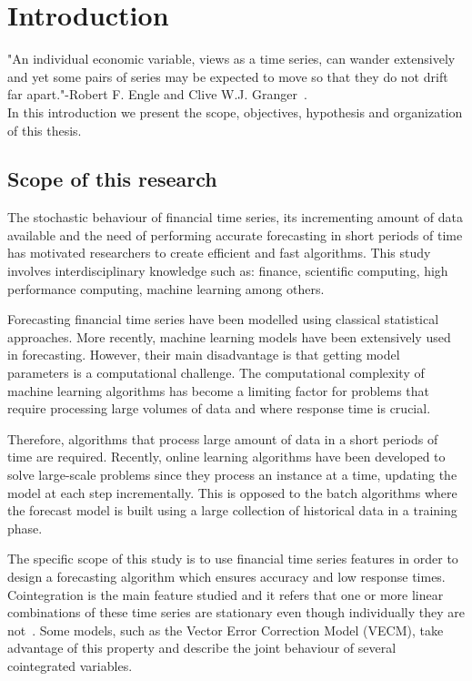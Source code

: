 \chapter{Introduction}\label{ch:introduction}

\vspace{0.5cm} 

"An individual economic variable, views as a time series, can wander extensively
and yet some pairs of series may be expected to move so that they do not drift
far apart."-Robert F. Engle and Clive W.J. Granger~\cite{engle1987}.\\
In this introduction we present the scope, objectives, hypothesis and
organization of this thesis.


\section{Scope of this research}

The stochastic behaviour of financial time series, its incrementing
amount of data available and the need of performing accurate forecasting in
short periods of time has motivated researchers to create efficient and fast
algorithms. This study involves interdisciplinary knowledge such as: finance,
scientific computing, high performance computing, machine learning
among others.

Forecasting financial time series have been modelled using classical statistical
approaches. More recently, machine learning models have been extensively used in
forecasting. However, their main disadvantage is that getting model parameters
is a computational challenge.  The computational complexity of machine learning
algorithms has become a limiting factor for problems that require processing
large volumes of data and where response time is crucial.

Therefore, algorithms that process large amount of data in a short periods of
time are required. Recently, online learning algorithms have been developed to solve
large-scale problems since they process an instance at a time, updating the
model at each step incrementally. This is opposed to the batch algorithms where
the forecast model is built using a large collection of historical data in
a training phase.

The specific scope of this study is to use financial time series features in
order to design a forecasting algorithm which ensures accuracy and low response
times. Cointegration is the main feature studied and it refers that one or more
linear combinations of these time series are stationary even though individually
they are not~\cite{engle87}.  Some models, such as the Vector Error Correction Model
(VECM), take advantage of this property and describe the joint behaviour of
several cointegrated variables.


